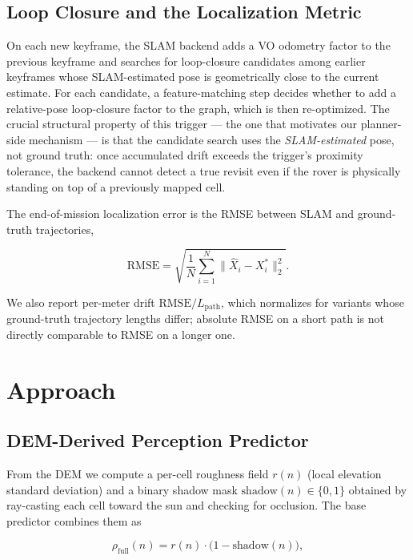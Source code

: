 \documentclass[letterpaper,times]{IONconf}
\begin{document}
\subsection{Loop Closure and the Localization Metric}
On each new keyframe, the SLAM backend adds a VO odometry factor to the previous keyframe and searches for loop-closure candidates among earlier keyframes whose SLAM-estimated pose is geometrically close to the current estimate. For each candidate, a feature-matching step decides whether to add a relative-pose loop-closure factor to the graph, which is then re-optimized. The crucial structural property of this trigger --- the one that motivates our planner-side mechanism --- is that the candidate search uses the \emph{SLAM-estimated} pose, not ground truth: once accumulated drift exceeds the trigger's proximity tolerance, the backend cannot detect a true revisit even if the rover is physically standing on top of a previously mapped cell.

The end-of-mission localization error is the RMSE between SLAM and ground-truth trajectories,

\begin{equation}
\label{eq:rmse}
\mathrm{RMSE} = \sqrt{\frac{1}{N} \sum_{i=1}^N \|\hat{X}_i - X_i^*\|_2^2}.
\end{equation}

We also report per-meter drift $\mathrm{RMSE}/L_{\text{path}}$, which normalizes for variants whose ground-truth trajectory lengths differ; absolute RMSE on a short path is not directly comparable to RMSE on a longer one.


\section{Approach}
\label{sec:approach}

\subsection{DEM-Derived Perception Predictor}
\label{sec:predictor}

From the DEM we compute a per-cell roughness field $r(n)$ (local elevation standard deviation) and a binary shadow mask $\mathrm{shadow}(n) \in \{0, 1\}$ obtained by ray-casting each cell toward the sun and checking for occlusion. The base predictor combines them as

\begin{equation}
\rho_{\text{full}}(n) = r(n) \cdot \big(1 - \mathrm{shadow}(n)\big),
\end{equation}
\end{document}
